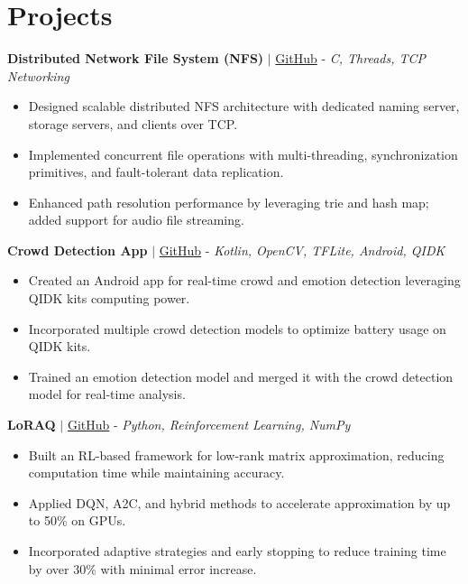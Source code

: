 \documentclass[letterpaper,11pt]{article}
\newcommand{\resumeItem}[1]{
  \item\small{
    {#1 \vspace{-2pt}}
  }
}
\newcommand{\resumeItemListStart}{\begin{itemize}[leftmargin=0.15in, topsep=2pt, partopsep=0pt, parsep=0pt, itemsep=2pt]}
\newcommand{\resumeItemListEnd}{\end{itemize}\vspace{-5pt}}
\begin{document}
\section{Projects}
\textbf{Distributed Network File System (NFS)} $|$ \href{https://github.com/Nidhishj/NFS}{GitHub} - \small{\textit{C, Threads, TCP Networking}} \\
\resumeItemListStart
\resumeItem{Designed scalable distributed NFS architecture with dedicated naming server, storage servers, and clients over TCP.}
\resumeItem{Implemented concurrent file operations with multi-threading, synchronization primitives, and fault-tolerant data replication.}
\vspace{-11pt}
\resumeItem{Enhanced path resolution performance by leveraging trie and hash map; added support for audio file streaming.}
\resumeItemListEnd
\vspace{8pt}

\textbf{Crowd Detection App} $|$ \href{https://github.com/Nidhishj/ESW-PROJECT}{GitHub} - \small{\textit{Kotlin, OpenCV, TFLite, Android, QIDK}} \\
\resumeItemListStart
\resumeItem{Created an Android app for real-time crowd and emotion detection leveraging QIDK kits computing power.}
\vspace{2pt}

\resumeItem{Incorporated multiple crowd detection models to optimize battery usage on QIDK kits.}
\vspace{2pt}

\resumeItem{Trained an emotion detection model and merged it with the crowd detection model for real-time analysis.}
\resumeItemListEnd
\vspace{8pt}


\textbf{LoRAQ} $|$ \href{https://github.com/Nidhishj/LoRAQ}{GitHub} - \small{\textit{Python, Reinforcement Learning, NumPy}} \\
\resumeItemListStart
\resumeItem{Built an RL-based framework for low-rank matrix approximation, reducing computation time while maintaining accuracy.}
\vspace{-10pt}
\resumeItem{Applied DQN, A2C, and hybrid methods to accelerate approximation by up to 50\% on GPUs.}
\vspace{2pt}
\resumeItem{Incorporated adaptive strategies and early stopping to reduce training time by over 30\% with minimal error increase.}
\resumeItemListEnd
\vspace{8pt}
\end{document}
